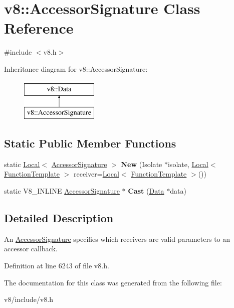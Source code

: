 \hypertarget{classv8_1_1AccessorSignature}{}\section{v8\+:\+:Accessor\+Signature Class Reference}
\label{classv8_1_1AccessorSignature}


{\ttfamily \#include $<$v8.\+h$>$}

Inheritance diagram for v8\+:\+:Accessor\+Signature\+:\begin{figure}[H]
\begin{center}
\leavevmode
\includegraphics[height=2.000000cm]{classv8_1_1AccessorSignature}
\end{center}
\end{figure}
\subsection*{Static Public Member Functions}
\begin{DoxyCompactItemize}
\item 
\mbox{\label{classv8_1_1AccessorSignature_a2d7f28b404be5ecdb501aaf572a7ee52}} 
static \mbox{\hyperlink{classv8_1_1Local}{Local}}$<$ \mbox{\hyperlink{classv8_1_1AccessorSignature}{Accessor\+Signature}} $>$ {\bfseries New} (Isolate $\ast$isolate, \mbox{\hyperlink{classv8_1_1Local}{Local}}$<$ \mbox{\hyperlink{classv8_1_1FunctionTemplate}{Function\+Template}} $>$ receiver=\mbox{\hyperlink{classv8_1_1Local}{Local}}$<$ \mbox{\hyperlink{classv8_1_1FunctionTemplate}{Function\+Template}} $>$())
\item 
\mbox{\label{classv8_1_1AccessorSignature_add2ad5697fb3b13d63de9d1e96db3758}} 
static V8\+\_\+\+I\+N\+L\+I\+NE \mbox{\hyperlink{classv8_1_1AccessorSignature}{Accessor\+Signature}} $\ast$ {\bfseries Cast} (\mbox{\hyperlink{classv8_1_1Data}{Data}} $\ast$data)
\end{DoxyCompactItemize}


\subsection{Detailed Description}
An \mbox{\hyperlink{classv8_1_1AccessorSignature}{Accessor\+Signature}} specifies which receivers are valid parameters to an accessor callback. 

Definition at line 6243 of file v8.\+h.



The documentation for this class was generated from the following file\+:\begin{DoxyCompactItemize}
\item 
v8/include/v8.\+h\end{DoxyCompactItemize}
